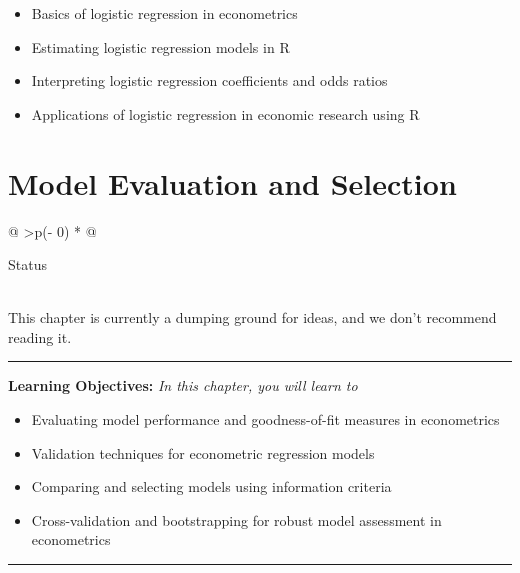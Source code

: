 \documentclass[
  letterpaper,
  twoside,
  openright,
  headsepline,
  footsepline,
  listof = totocnumbered,
  chapterprefix = true,
  titlepage = false]{scrbook}
\providecommand{\abstractname}{Learning Objectives} %
\newenvironment{objectives}[1]{%
	\hrule
	\vspace{5pt}
	\small\textbf{\abstractname: } 
	\newline
	\vspace{0.1cm}
	\small\emph{#1} %
	\itshape %
}{%
	\vspace{5pt}
	\hrule
	\vspace{0.6cm}
}
\begin{document}
\begin{itemize}
\item
  Basics of logistic regression in econometrics
\item
  Estimating logistic regression models in R
\item
  Interpreting logistic regression coefficients and odds ratios
\item
  Applications of logistic regression in economic research using R
\end{itemize}


\hypertarget{model-evaluation-and-selection}{%
\chapter{Model Evaluation and
Selection}\label{model-evaluation-and-selection}}

\begin{longtable}[]{@{}
  >{\centering\arraybackslash}p{(\columnwidth - 0\tabcolsep) * }@{}}
\toprule\noalign{}
\begin{minipage}[b]{\linewidth}\centering
Status
\end{minipage} \\
\midrule\noalign{}
\endhead
\bottomrule\noalign{}
\endlastfoot
This chapter is currently a dumping ground for ideas, and we don't
recommend reading it. \\
\end{longtable}

\begin{objectives}{In this chapter, you will learn to}
\begin{itemize}

\item{Evaluating model performance and goodness-of-fit measures in econometrics}

\item{Validation techniques for econometric regression models}

\item{Comparing and selecting models using information criteria}

\item{Cross-validation and bootstrapping for robust model assessment in econometrics}

\end{itemize}

\end{objectives}
\end{document}
